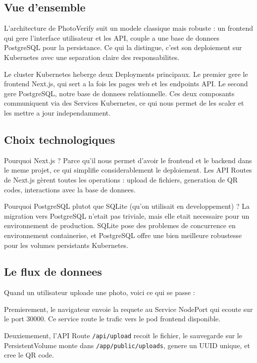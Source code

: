 \documentclass[12pt,a4paper]{article}
\begin{document}
\subsection{Vue d'ensemble}

L'architecture de PhotoVerify suit un modele classique mais robuste : un frontend qui gere l'interface utilisateur et les API, couple a une base de donnees PostgreSQL pour la persistance. Ce qui la distingue, c'est son deploiement sur Kubernetes avec une separation claire des responsabilites.

Le cluster Kubernetes heberge deux Deployments principaux. Le premier gere le frontend Next.js, qui sert a la fois les pages web et les endpoints API. Le second gere PostgreSQL, notre base de donnees relationnelle. Ces deux composants communiquent via des Services Kubernetes, ce qui nous permet de les scaler et les mettre a jour independamment.

\subsection{Choix technologiques}

Pourquoi Next.js ? Parce qu'il nous permet d'avoir le frontend et le backend dans le meme projet, ce qui simplifie considerablement le deploiement. Les API Routes de Next.js gèrent toutes les operations : upload de fichiers, generation de QR codes, interactions avec la base de donnees.

Pourquoi PostgreSQL plutot que SQLite (qu'on utilisait en developpement) ? La migration vers PostgreSQL n'etait pas triviale, mais elle etait necessaire pour un environnement de production. SQLite pose des problemes de concurrence en environnement containerise, et PostgreSQL offre une bien meilleure robustesse pour les volumes persistants Kubernetes.

\subsection{Le flux de donnees}

Quand un utilisateur uploade une photo, voici ce qui se passe :

Premierement, le navigateur envoie la requete au Service NodePort qui ecoute sur le port 30000. Ce service route le trafic vers le pod frontend disponible.

Deuxiemement, l'API Route \texttt{/api/upload} recoit le fichier, le sauvegarde sur le PersistentVolume monte dans \texttt{/app/public/uploads}, genere un UUID unique, et cree le QR code.
\end{document}
